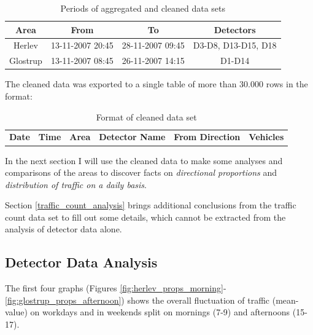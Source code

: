 \begin{table}[!ht]
\begin{center}
\begin{tabular}{c|c|c|c}
\textbf{Area} & \textbf{From} & \textbf{To} & \textbf{Detectors} \\ \hline
Herlev & 13-11-2007 20:45 & 28-11-2007 09:45 & D3-D8, D13-D15, D18 \\
Glostrup & 13-11-2007 08:45 & 26-11-2007 14:15 & D1-D14 \\
\end{tabular}
\end{center}
\caption{Periods of aggregated and cleaned data sets}
\label{tab:dataperiod}
\end{table}

The cleaned data was exported to a single table of more than 30.000 rows in the format:
\begin{table}[!ht]
\begin{center}
\begin{tabular}{c|c|c|c|c|c}
\textbf{Date} & \textbf{Time} & \textbf{Area} & \textbf{Detector Name} & \textbf{From Direction} & \textbf{Vehicles} \\
\end{tabular}
\end{center}
\caption{Format of cleaned data set}
\label{tab:cleandataformat}
\end{table}

In the next section I will use the cleaned data to make some analyses and comparisons of the areas to discover facts on \textit{directional proportions} and \textit{distribution of traffic on a daily basis}.

Section \ref{traffic_count_analysis} brings additional conclusions from the traffic count data set to fill out some details, which cannot be extracted from the analysis of detector data alone.

\subsection{Detector Data Analysis}

The first four graphs (Figures \ref{fig:herlev_props_morning}-\ref{fig:glostrup_props_afternoon}) shows the overall fluctuation of traffic (mean-value) on workdays and in weekends split on mornings (7-9) and afternoons (15-17).

